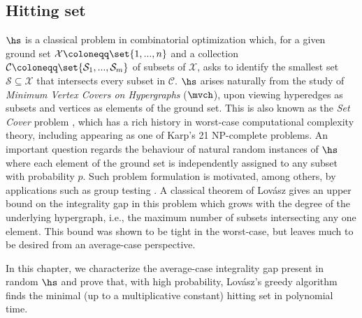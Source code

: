 \subsection{Hitting set}

$\hs$ is a classical problem in combinatorial optimization which, for a given ground set $\mathcal{X}\coloneqq\set{1,...,n}$ and a collection $\mathcal{C} \coloneqq \set{\mathcal{S}_1,...,\mathcal{S}_m}$ of subsets of $\mathcal{X}$, asks to identify the smallest set $\mathcal{S}\subseteq \mathcal{X}$ that intersects every subset in $\mathcal{C}$. 
$\hs$ arises naturally from the study of \emph{Minimum Vertex Covers on Hypergraphs} ($\mvch$), upon viewing hyperedges as subsets and vertices as elements of the ground set. 
This is also known as the \emph{Set Cover} problem \cite{paschos1997survey}, which has a rich history in worst-case computational complexity theory, including appearing as one of Karp's 21 NP-complete problems. 
An important question regards the behaviour of natural random instances of $\hs$ where each element of the ground set is independently assigned to any subset with probability $p$.
Such problem formulation is motivated, among others, by applications such as group testing \cite{iliopoulos2021group}. 
A classical theorem of Lovász \cite{lovasz1975ratio} gives an upper bound on the integrality gap in this problem which grows with the degree of the underlying hypergraph, i.e., the maximum number of subsets intersecting any one element. 
This bound was shown to be tight in the worst-case, but leaves much to be desired from an average-case perspective.

In this chapter, we characterize the average-case integrality gap present in random $\hs$ and prove that, with high probability, Lovász's greedy algorithm \cite{lovasz1975ratio} finds the minimal (up to a multiplicative constant) hitting set in polynomial time. 

